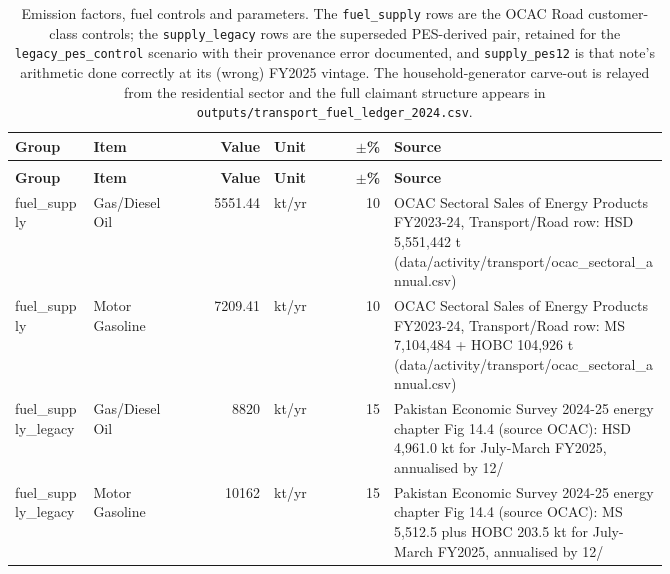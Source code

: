 {\scriptsize
\setlength{\tabcolsep}{3pt}
\begin{longtable}{@{}>{\raggedright\arraybackslash}p{0.12\linewidth}>{\raggedright\arraybackslash}p{0.13\linewidth}r>{\raggedright\arraybackslash}p{0.09\linewidth}r>{\raggedright\arraybackslash}p{0.42\linewidth}@{}}
\caption{Emission factors, fuel controls and parameters. The
\texttt{fuel\_supply} rows are the OCAC Road customer-class controls;
the \texttt{supply\_legacy} rows are the superseded PES-derived pair,
retained for the \texttt{legacy\_pes\_control} scenario with their
provenance error documented, and \texttt{supply\_pes12} is that note's
arithmetic done correctly at its (wrong) FY2025 vintage. The
household-generator carve-out is relayed from the residential sector and
the full claimant structure appears in
\texttt{outputs/transport\_fuel\_ledger\_2024.csv}.}
\label{tab:s2factors} \\
\toprule
\textbf{Group} & \textbf{Item} & \textbf{Value} & \textbf{Unit} & \textbf{$\pm$\%} & \textbf{Source} \\
\midrule
\endfirsthead
\multicolumn{6}{@{}l}{\emph{Table \thetable{} continued}} \\
\toprule
\textbf{Group} & \textbf{Item} & \textbf{Value} & \textbf{Unit} & \textbf{$\pm$\%} & \textbf{Source} \\
\midrule
\endhead
\bottomrule
\endfoot
fuel\_\allowbreak supply & Gas/\allowbreak Diesel Oil & 5551.44 & kt/\allowbreak yr & 10 & OCAC Sectoral Sales of Energy Products FY2023-24, Transport/\allowbreak Road row: HSD 5,551,442 t (data/\allowbreak activity/\allowbreak transport/\allowbreak ocac\_\allowbreak sectoral\_\allowbreak annual.csv) \\
fuel\_\allowbreak supply & Motor Gasoline & 7209.41 & kt/\allowbreak yr & 10 & OCAC Sectoral Sales of Energy Products FY2023-24, Transport/\allowbreak Road row: MS 7,104,484 + HOBC 104,926 t (data/\allowbreak activity/\allowbreak transport/\allowbreak ocac\_\allowbreak sectoral\_\allowbreak annual.csv) \\
fuel\_\allowbreak supply\_\allowbreak legacy & Gas/\allowbreak Diesel Oil & 8820 & kt/\allowbreak yr & 15 & Pakistan Economic Survey 2024-25 energy chapter Fig 14.4 (source OCAC): HSD 4,961.0 kt for July-March FY2025, annualised by 12/\allowbreak 9 \\
fuel\_\allowbreak supply\_\allowbreak legacy & Motor Gasoline & 10162 & kt/\allowbreak yr & 15 & Pakistan Economic Survey 2024-25 energy chapter Fig 14.4 (source OCAC): MS 5,512.5 plus HOBC 203.5 kt for July-March FY2025, annualised by 12/\allowbreak 9 \\

\end{longtable}}
